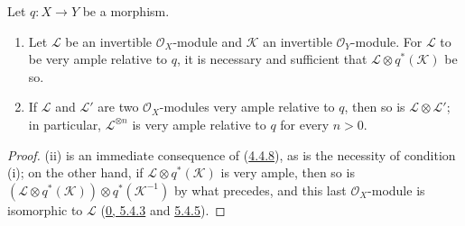 \begin{corollary}[4.4.9]
\label{II.4.4.9}
Let $q:X\to Y$ be a morphism.
\begin{enumerate}
  \item[\rm{(i)}] Let $\mathcal{L}$ be an invertible $\mathcal{O}_X$-module
  and $\mathcal{K}$ an invertible $\mathcal{O}_Y$-module. For $\mathcal{L}$
  to be very ample relative to $q$, it is necessary and sufficient that
  $\mathcal{L}\otimes q^*(\mathcal{K})$ be so.
  \item[\rm{(ii)}] If $\mathcal{L}$ and $\mathcal{L}'$ are two
  $\mathcal{O}_X$-modules very ample relative to $q$, then so is
  $\mathcal{L}\otimes\mathcal{L}'$; in particular,
  $\mathcal{L}^{\otimes n}$ is very ample relative to $q$ for every
  $n>0$.
\end{enumerate}
\end{corollary}

\begin{proof}
(ii) is an immediate consequence of (\hyperref[II.4.4.8]{4.4.8}), as is
the necessity of condition (i); on the other hand, if
$\mathcal{L}\otimes q^*(\mathcal{K})$ is very ample, then so is
$(\mathcal{L}\otimes q^*(\mathcal{K}))\otimes q^*(\mathcal{K}^{-1})$
by what precedes, and this last $\mathcal{O}_X$-module is isomorphic to
$\mathcal{L}$ (\hyperref[0.5.4.3]{0, 5.4.3} and
\hyperref[0.5.4.5]{5.4.5}).
\end{proof}

